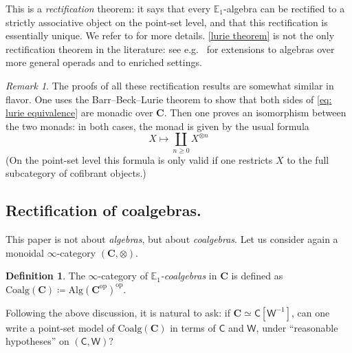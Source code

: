 \documentclass{proc-l}
\theoremstyle{plain}
\theoremstyle{definition}
\newtheorem{definition}[{theorem}]{Definition}
\theoremstyle{remark}
\newtheorem{remark}[{theorem}]{Remark}
\begin{document}
This is %
a \emph{rectification} theorem: it says that every $\mathbb E_1$-algebra can be rectified to a strictly associative object on the point-set level, and that this rectification is essentially unique. We refer to \cite[Section 4.1.8]{HigherAlgebra} for more details. \cref{lurie theorem} is not the only rectification theorem in the literature: %
see e.g.\ \cite{haugseng-rectification,HinichRectification,PavlovScholbach18} for extensions to algebras over more general operads and to enriched settings.

\begin{remark}%
\label{Remark:1.2}\label{strategy remark}
The proofs of all these rectification results are somewhat similar in flavor. One uses the Barr--Beck--Lurie theorem to show that both sides of \eqref{eq: lurie equivalence} are monadic over $\mathbf C$. Then one proves an isomorphism between the two monads: in both cases, the monad is given by the usual %
formula
\begin{equation}
\label{classical free algebra} X \mapsto \coprod_{n \geq 0} X^{\otimes n}
\end{equation}%
(On %
the point-set level this formula is only valid if one restricts $X$ to the full subcategory of cofibrant objects.)
\end{remark}

\subsection{Rectification of coalgebras.}%
\label{Section:1.2} This paper is not about \emph{algebras}, but about \emph{coalgebras}.
Let us consider again a monoidal $\infty$-category $(\mathbf C,\otimes)$.

\begin{definition}%
\label{Definition:1.3}\label{def:coalgebra}The $\infty$-category of \emph{$\mathbb E_1$-coalgebras} in $\mathbf{C}$ is defined as $\mathrm{Coalg}(\mathbf C) \coloneqq \mathrm{Alg}(\mathbf C^{\mathrm{op}})^{\mathrm{op}}$.
\end{definition}

Following the above discussion, it is natural to ask: if $\mathbf C \simeq \mathsf C[\mathsf W^{-1}]$, can one write a point-set model of $\mathrm{Coalg}(\mathbf C)$ in terms of $\mathsf C$ and $\mathsf W$, under ``reasonable hypotheses''  on $(\mathsf C,\mathsf W)$?
\end{document}
